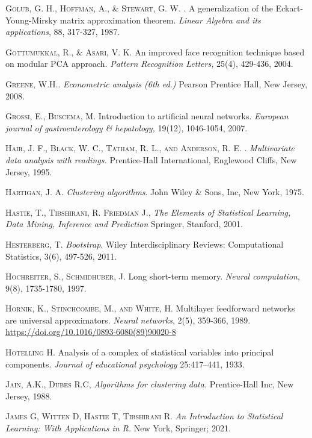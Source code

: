 \begin{thebibliography}{99}
\textsc{Golub, G. H., Hoffman, A., \& Stewart, G. W. }. A generalization of the Eckart-Young-Mirsky matrix approximation theorem. \emph{Linear Algebra and its applications}, 88, 317-327, 1987. 

 \textsc{Gottumukkal, R., \& Asari, V. K. } An improved face recognition technique based on modular PCA approach.\emph{ Pattern Recognition Letters,} 25(4), 429-436, 2004.

\textsc{Greene,  W.H.}. \emph{Econometric analysis (6th ed.)} Pearson Prentice Hall, New Jersey, 2008.

\textsc{Grossi, E.,  Buscema, M.  }Introduction to artificial neural networks. \emph{European journal of gastroenterology \& hepatology,} 19(12), 1046-1054, 2007.

\textsc{Hair, J. F., Black, W. C., Tatham, R. L., and Anderson, R. E. .}
\textit{ Multivariate data analysis with readings.} Prentice-Hall International, Englewood Cliffs, New Jersey, 1995.

\textsc{Hartigan, J. A. }\emph{ Clustering algorithms}. John Wiley \& Sons, Inc, New York, 1975. 

 \textsc{Hastie, T., Tibshirani, R. Friedman J.}, \textit{The Elements of Statistical Learning, Data Mining, Inference and Prediction} Springer, Stanford, 2001.

\textsc{Hesterberg, T.} \emph{Bootstrap}. Wiley Interdisciplinary Reviews: Computational Statistics, 3(6), 497-526, 2011.

\textsc{Hochreiter, S.,  Schmidhuber, J. } Long short-term memory.\emph{ Neural computation}, 9(8), 1735-1780, 1997.

 \textsc{Hornik, K., Stinchcombe, M., and White, H. } Multilayer feedforward networks are universal approximators. \emph{Neural networks}, 2(5), 359-366, 1989.
\url{https://doi.org/10.1016/0893-6080(89)90020-8}

\textsc{Hotelling H. } Analysis of a complex of statistical variables
into principal components. \emph{ Journal of educational psychology }
25:417–441, 1933.

 \textsc{Jain, A.K., Dubes R.C,} \textit{Algorithms for clustering data.} Prentice-Hall Inc, New Jersey,  1988.

\textsc{James G, Witten D, Hastie T, Tibshirani R.} \emph{An Introduction to Statistical Learning: With Applications in R.} New York, Springer; 2021. 


\end{thebibliography}
